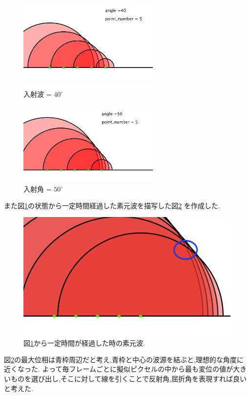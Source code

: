 \begin{figure}[H]
\begin{minipage}{0.5\hsize}
\begin{center}
\includegraphics[width=70mm]
  {../considaration/angle40.png}
\caption{入射波 = $40^{\circ}$}
\label{fig:angle40}
\end{center}
\end{minipage}%
\begin{minipage}{0.5\hsize}
\begin{center}
\includegraphics[width=70mm]
  {../considaration/angle50.png}
\caption{入射角 = $50^{\circ}$}
\label{fig:angle50}
\end{center}
\end{minipage}
\end{figure}
また図\ref{fig:angle50}の状態から一定時間経過した素元波を描写した図\ref{fig:angle50time}
を作成した.
\begin{figure}[H]
 \begin{center}
  \includegraphics[width=130mm]{../considaration/angle50time.png}
 \end{center}
 \caption{図\ref{fig:angle50}から一定時間が経過した時の素元波.}
 \label{fig:angle50time}
\end{figure}
図\ref{fig:angle50time}の最大位相は青枠周辺だと考え,青枠と中心の波源を結ぶと,理想的な角度に近くなった.
よって毎フレームごとに擬似ピクセルの中から最も変位の値が大きいものを選び出し,そこに対して線を引くことで反射角,屈折角を表現すれば良いと考えた.
